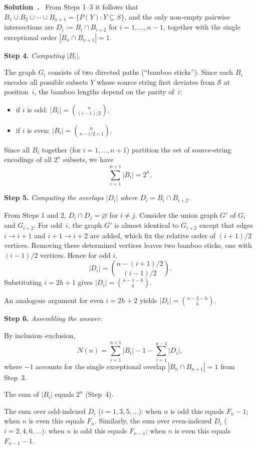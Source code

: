 \documentclass[a4paper,12pt]{article}
\newenvironment{solution}[1][]{%
  \goodbreak\smallskip\par\noindent\textbf{Solution\if\relax\detokenize{#1}\relax\else~#1\fi.}~}%
{%
  \goodbreak
}
\begin{document}
\begin{solution}
\medskip
From Steps 1--3 it follows that $B_1 \cup B_2 \cup \cdots \cup B_{n+1} = \{P(Y) : Y \subseteq S\}$, and the only non-empty pairwise intersections are $D_i := B_i \cap B_{i+2}$ for $i = 1, \ldots, n-1$, together with the single exceptional order $|B_n \cap B_{n+1}| = 1$.

\medskip
\textbf{Step 4.} \textit{Computing $|B_i|$.}

The graph $G_i$ consists of two directed paths (``bamboo sticks''). Since each $B_i$ encodes all possible subsets $Y$ whose source string first deviates from $\mathcal{S}$ at position~$i$, the bamboo lengths depend on the parity of~$i$:
\begin{itemize}
  \item if $i$ is odd: $|B_i| = \displaystyle\binom{n}{(i-1)/2}$,
  \item if $i$ is even: $|B_i| = \displaystyle\binom{n}{n - i/2 + 1}$.
\end{itemize}
Since all $B_i$ together (for $i = 1, \ldots, n+1$) partition the set of source-string encodings of all $2^n$ subsets, we have
\[
  \sum_{i=1}^{n+1} |B_i| = 2^n.
\]

\medskip
\textbf{Step 5.} \textit{Computing the overlaps $|D_i|$ where $D_i = B_i \cap B_{i+2}$.}

From Steps 1 and 2, $D_i \cap D_j = \varnothing$ for $i \neq j$. Consider the union graph $G'$ of $G_i$ and $G_{i+2}$. For odd~$i$, the graph $G'$ is almost identical to $G_{i+2}$ except that edges $i \to i+1$ and $i+1 \to i+2$ are added, which fix the relative order of $(i+1)/2$ vertices. Removing these determined vertices leaves two bamboo sticks, one with $(i-1)/2$ vertices. Hence for odd $i$,
\[
  |D_i| = \binom{n - (i+1)/2}{(i-1)/2}.
\]
Substituting $i = 2h + 1$ gives $|D_i| = \binom{n - 1 - h}{h}$.

An analogous argument for even $i = 2h + 2$ yields $|D_i| = \binom{n - 2 - h}{h}$.

\medskip
\textbf{Step 6.} \textit{Assembling the answer.}

By inclusion--exclusion,
\[
  N(n) = \sum_{i=1}^{n+1} |B_i| - 1 - \sum_{i=1}^{n-1} |D_i|,
\]
where $-1$ accounts for the single exceptional overlap $|B_n \cap B_{n+1}| = 1$ from Step~3.

The sum of $|B_i|$ equals $2^n$ (Step~4).

The sum over odd-indexed $D_i$ ($i = 1, 3, 5, \ldots$): when $n$ is odd this equals $F_n - 1$; when $n$ is even this equals $F_n$. Similarly, the sum over even-indexed $D_i$ ($i = 2, 4, 6, \ldots$): when $n$ is odd this equals $F_{n-1}$; when $n$ is even this equals $F_{n-1} - 1$.


\end{solution}
\end{document}
